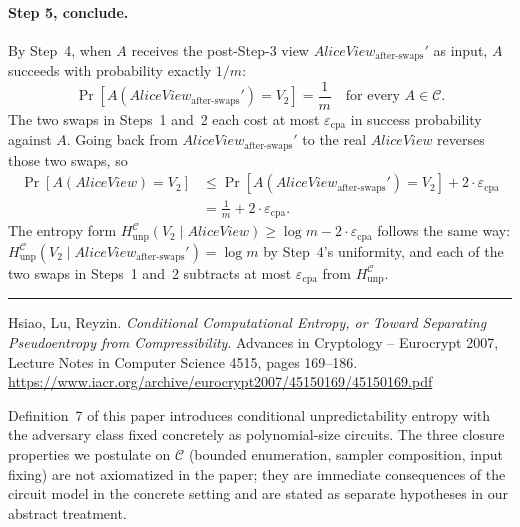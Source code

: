 \documentclass[11pt]{article}
\newcommand{\epscpa}{\varepsilon_{\mathrm{cpa}}}
\newcommand{\HunpC}{H_{\mathrm{unp}}^{\mathcal{C}}}
\newcommand{\C}{\mathcal{C}}
\newcommand{\AliceView}{\mathit{AliceView}}
\newcommand{\AliceViewHyb}{\mathit{AliceView}_{\textrm{after-swaps}}'}
\begin{document}
\paragraph{Step 5, conclude.} By Step~4, when $A$ receives the post-Step-3 view $\AliceViewHyb$ as input, $A$ succeeds with probability exactly $1/m$:
\[
\Pr[A(\AliceViewHyb) = V_2] = \frac{1}{m} \quad \text{for every } A \in \C.
\]
The two swaps in Steps~1 and~2 each cost at most $\epscpa$ in success probability against $A$. Going back from $\AliceViewHyb$ to the real $\AliceView$ reverses those two swaps, so
\begin{align*}
\Pr[A(\AliceView) = V_2] &\leq \Pr[A(\AliceViewHyb) = V_2] + 2 \cdot \epscpa \\
                          &= \tfrac{1}{m} + 2 \cdot \epscpa.
\end{align*}
The entropy form $\HunpC(V_2 \mid \AliceView) \geq \log m - 2 \cdot \epscpa$ follows the same way: $\HunpC(V_2 \mid \AliceViewHyb) = \log m$ by Step~4's uniformity, and each of the two swaps in Steps~1 and~2 subtracts at most $\epscpa$ from $\HunpC$.

\bigskip
\hrule
\bigskip

\noindent
[1] Hsiao, Lu, Reyzin. \emph{Conditional Computational Entropy, or Toward Separating Pseudoentropy from Compressibility}. Advances in Cryptology -- Eurocrypt 2007, Lecture Notes in Computer Science 4515, pages 169--186. \url{https://www.iacr.org/archive/eurocrypt2007/45150169/45150169.pdf}

\smallskip

\noindent
Definition~7 of this paper introduces conditional unpredictability entropy with the adversary class fixed concretely as polynomial-size circuits. The three closure properties we postulate on $\C$ (bounded enumeration, sampler composition, input fixing) are not axiomatized in the paper; they are immediate consequences of the circuit model in the concrete setting and are stated as separate hypotheses in our abstract treatment.
\end{document}
